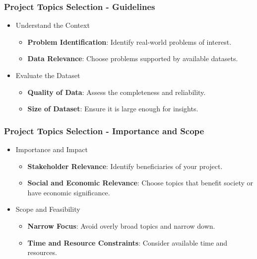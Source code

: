 \documentclass[aspectratio=169]{beamer}
\begin{document}
\begin{frame}[fragile]
    \frametitle{Project Topics Selection - Guidelines}
    \begin{itemize}
        \item Understand the Context
        \begin{itemize}
            \item \textbf{Problem Identification}: Identify real-world problems of interest.
            \item \textbf{Data Relevance}: Choose problems supported by available datasets.
        \end{itemize}
        
        \item Evaluate the Dataset
        \begin{itemize}
            \item \textbf{Quality of Data}: Assess the completeness and reliability.
            \item \textbf{Size of Dataset}: Ensure it is large enough for insights.
        \end{itemize}
    \end{itemize}
\end{frame}

\begin{frame}[fragile]
    \frametitle{Project Topics Selection - Importance and Scope}
    \begin{itemize}
        \item Importance and Impact
        \begin{itemize}
            \item \textbf{Stakeholder Relevance}: Identify beneficiaries of your project.
            \item \textbf{Social and Economic Relevance}: Choose topics that benefit society or have economic significance.
        \end{itemize}

        \item Scope and Feasibility
        \begin{itemize}
            \item \textbf{Narrow Focus}: Avoid overly broad topics and narrow down.
            \item \textbf{Time and Resource Constraints}: Consider available time and resources.
        \end{itemize}
    \end{itemize}
\end{frame}
\end{document}
